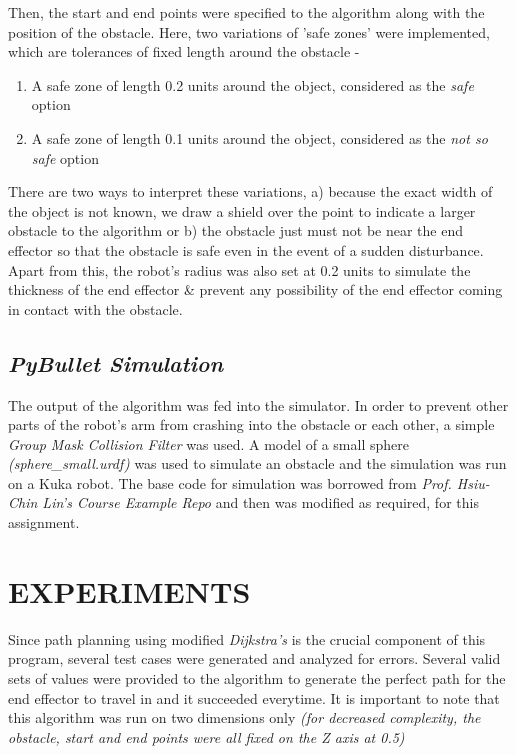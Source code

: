 \documentclass[a4paper]{article}
\begin{document}
Then, the start and end points were specified to the algorithm along with the position of the obstacle. Here, two variations of 'safe zones' were implemented, which are tolerances of fixed length around the obstacle - 
\begin{enumerate}
    \item A safe zone of length 0.2 units around the object, considered as the {\it safe} option
    \item A safe zone of length 0.1 units around the object, considered as the {\it not so safe} option
\end{enumerate}
There are two ways to interpret these variations, a) because the exact width of the object is not known, we draw a shield over the point to indicate a larger obstacle to the algorithm or b) the obstacle just must not be near the end effector so that the obstacle is safe even in the event of a sudden disturbance. Apart from this, the robot's radius was also set at 0.2 units to simulate the thickness of the end effector \& prevent any possibility of the end effector coming in contact with the obstacle.\\

\subsection{\it \textbf{PyBullet Simulation}}

The output of the algorithm was fed into the simulator. In order to prevent other parts of the robot's arm from crashing into the obstacle or each other, a simple {\it Group Mask Collision Filter} was used. A model of a small sphere {\it(sphere\_small.urdf)} was used to simulate an obstacle and the simulation was run on a Kuka robot. The base code for simulation was borrowed from {\it Prof. Hsiu-Chin Lin's Course Example Repo} and then was modified as required, for this assignment.

\bigskip

\section{EXPERIMENTS}

Since path planning using modified {\it Dijkstra's} is the crucial component of this program, several test cases were generated and analyzed for errors. Several valid sets of values were provided to the algorithm to generate the perfect path for the end effector to travel in and it succeeded everytime. It is important to note that this algorithm was run on two dimensions only {\it(for decreased complexity, the obstacle, start and end points were all fixed on the Z axis at 0.5)}\\
\end{document}

